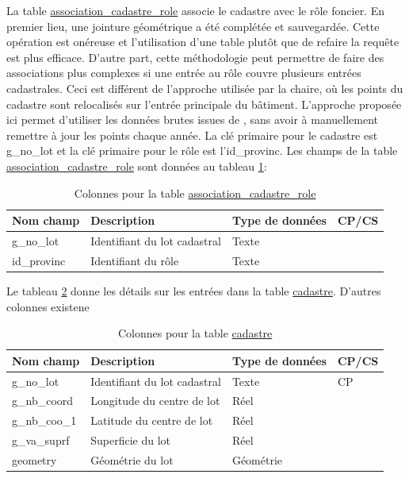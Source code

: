     La table \underline{association\_cadastre\_role} associe le cadastre avec le rôle foncier. En premier lieu, une jointure géométrique a été complétée et sauvegardée. Cette opération est onéreuse et l'utilisation d'une table plutôt que de refaire la requête est plus efficace. D'autre part, cette méthodologie peut permettre de faire des associations plus complexes si une entrée au rôle couvre plusieurs entrées cadastrales. Ceci est différent de l'approche utilisée par la chaire, où les points du cadastre sont relocalisés sur l'entrée principale du bâtiment. L'approche proposée ici permet d'utiliser les données brutes issues de \textcite{gouvernement_du_quebec_manuel_2024}, sans avoir à manuellement remettre à jour les points chaque année. La clé primaire pour le cadastre est g\_no\_lot et la clé primaire pour le rôle est l'id\_provinc. Les champs de la table \underline{association\_cadastre\_role} sont données au tableau \ref{tab:definition_assoc_role_cadastre}:
    \begin{table}[h]
       \centering
       \begin{tabular}{m{}|m{}m{}m{}}
            \hline
            Nom champ & Description & Type de données & CP/CS  \\
            \hline
            g\_no\_lot & Identifiant du lot cadastral & Texte & \\
            id\_provinc & Identifiant du rôle & Texte & \\
            \hline
       \end{tabular}
       \caption{Colonnes pour la table \underline{association\_cadastre\_role}}
       \label{tab:definition_assoc_role_cadastre}
    \end{table}   
    \par
    Le tableau \ref{tab:definition_cadastre} donne les détails sur les entrées dans la table \underline{cadastre}. D'autres colonnes existene
    \begin{table}[!h]
       \centering
       \begin{tabular}{m{}|m{}m{}m{}}
            \hline
            Nom champ       & Description                   & Type de données   & CP/CS  \\
            \hline
            g\_no\_lot      & Identifiant du lot cadastral  & Texte             & CP\\
            g\_nb\_coord    & Longitude du centre de lot    & Réel              & \\
            g\_nb\_coo\_1   & Latitude du centre de lot     & Réel              & \\
            g\_va\_suprf    & Superficie du lot             & Réel              & \\
            geometry        & Géométrie du lot              & Géométrie         & \\
            \hline
       \end{tabular}
       \caption{Colonnes pour la table \underline{cadastre}}
       \label{tab:definition_cadastre}
    \end{table}   
